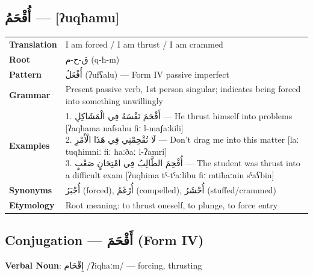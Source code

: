 \documentclass[letterpaper,12pt]{article}
\begin{document}
\subsection{\textarabic{أُقْحَمُ} — [ʔuqħamu]}
\begin{tabular}{p{3cm}p{10cm}}
\toprule
\textbf{Translation} & I am forced / I am thrust / I am crammed \\
\textbf{Root} & \textarabic{ق-ح-م} (q-ħ-m) \\
\textbf{Pattern} & \textarabic{أُفْعَلُ} (ʔufʕalu) — Form IV passive imperfect \\
\textbf{Grammar} & Present passive verb, 1st person singular; indicates being forced into something unwillingly \\
\midrule
\textbf{Examples} & \makecell[l]{\parbox{9.5cm}{
1. \textarabic{أَقْحَمَ نَفْسَهُ فِي الْمَشَاكِلِ} — He thrust himself into problems [ʔaqħama nafsahu fiː l-maʃaːkili]\\
2. \textarabic{لَا تُقْحِمْنِي فِي هَذَا الْأَمْرِ} — Don't drag me into this matter [laː tuqħimniː fiː haːðaː l-ʔamri]\\
3. \textarabic{أُقْحِمَ الطَّالِبُ فِي امْتِحَانٍ صَعْبٍ} — The student was thrust into a difficult exam [ʔuqħima tˤ-tˤaːlibu fiː mtiħaːnin sˤaʕbin]
}} \\
\midrule
\textbf{Synonyms} & \textarabic{أُجْبَرُ} (forced), \textarabic{أُرْغَمُ} (compelled), \textarabic{أُحْشَرُ} (stuffed/crammed) \\
\textbf{Etymology} & Root meaning: to thrust oneself, to plunge, to force entry \\
\bottomrule
\end{tabular}

\subsection{Conjugation — \textarabic{أَقْحَمَ} (Form IV)}
\par{\large\textbf{Verbal Noun}: \textarabic{إِقْحَام} /ʔiqħaːm/ — forcing, thrusting}
\end{document}
